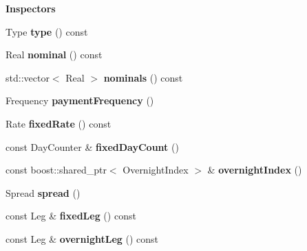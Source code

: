 \begin{Indent}{\bf Inspectors}\par
\begin{DoxyCompactItemize}
\item 
Type {\bfseries type} () const \label{class_quant_lib_1_1_overnight_indexed_swap_a2ac991651858ddb3bb2cc9c2236cad89}

\item 
Real {\bfseries nominal} () const \label{class_quant_lib_1_1_overnight_indexed_swap_a0b97ad0780f73bef39f7290d26ddc322}

\item 
std\+::vector$<$ Real $>$ {\bfseries nominals} () const \label{class_quant_lib_1_1_overnight_indexed_swap_a4db847ad47a6c0b66bc0329626c5cf70}

\item 
Frequency {\bfseries payment\+Frequency} ()\label{class_quant_lib_1_1_overnight_indexed_swap_a5051b3e8bf446c17d5710a4fd46214cc}

\item 
Rate {\bfseries fixed\+Rate} () const \label{class_quant_lib_1_1_overnight_indexed_swap_a360aa1be5d31e97a624a02d53dda69cc}

\item 
const Day\+Counter \& {\bfseries fixed\+Day\+Count} ()\label{class_quant_lib_1_1_overnight_indexed_swap_a527f6046f746b365bc5af8c81252010b}

\item 
const boost\+::shared\+\_\+ptr$<$ Overnight\+Index $>$ \& {\bfseries overnight\+Index} ()\label{class_quant_lib_1_1_overnight_indexed_swap_a831445e9998bd54e133619057ab72548}

\item 
Spread {\bfseries spread} ()\label{class_quant_lib_1_1_overnight_indexed_swap_ab00a9951284e36ed941a3d986539c65f}

\item 
const Leg \& {\bfseries fixed\+Leg} () const \label{class_quant_lib_1_1_overnight_indexed_swap_aeb4fd2872945044ccfed3191372fe56d}

\item 
const Leg \& {\bfseries overnight\+Leg} () const \label{class_quant_lib_1_1_overnight_indexed_swap_af5f40df4a71952e680e580c48faacb19}

\end{DoxyCompactItemize}
\end{Indent}
